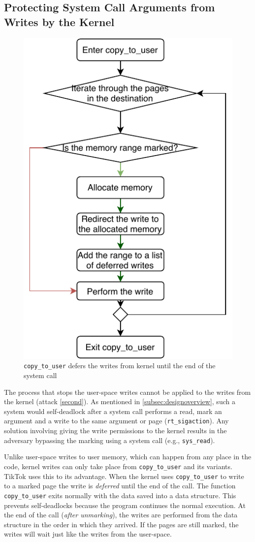 \subsection{Protecting System Call Arguments from Writes by the Kernel}
\label{subsec:kernelland}
\begin{figure}[]
  \centering
  \includegraphics[width = .30 \textwidth]{img/copy_to_user.pdf}
  \caption{\texttt{copy\_to\_user} defers the writes from kernel until the end
  of the system call}
  \label{fig:copytouser}
\end{figure}


The process that stops the user-space writes cannot be applied to the writes
from the kernel (attack \ref{second}). As mentioned in
\cref{subsec:designoverview}, such a system would self-deadlock after a system
call performs a read, mark an argument and a write to the same argument or page
(\texttt{rt\_sigaction}). Any solution involving giving the write permissions to
the kernel results in the adversary bypassing the marking using a system call
(e.g., \texttt{sys\_read}).

Unlike user-space writes to user memory, which can happen from any place in the
code, kernel writes can only take place from \texttt{copy\_to\_user} and its
variants. TikTok uses this to its advantage. When the kernel uses
\texttt{copy\_to\_user} to write to a marked page the write is \emph{deferred}
until the end of the call. The function \texttt{copy\_to\_user} exits normally
with the data saved into a data structure. This prevents self-deadlocks because
the program continues the normal execution. At the end of the call (\emph{after
unmarking}), the writes are performed from the data structure in the order in
which they arrived. If the pages are still marked, the writes will wait just
like the writes from the user-space.

